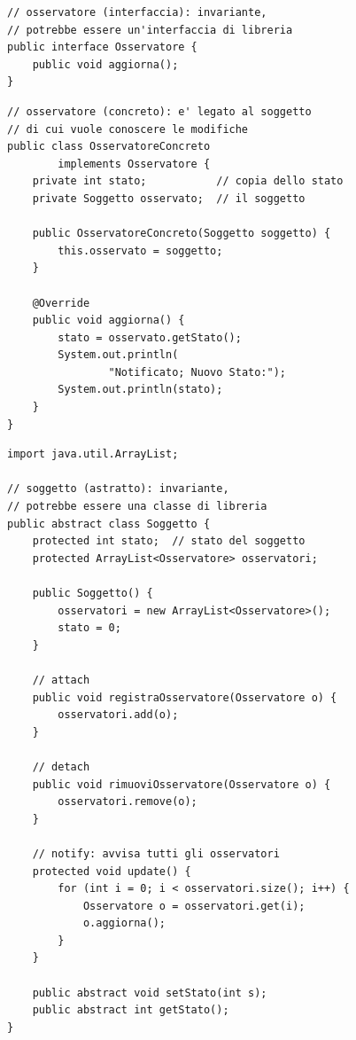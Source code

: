\noindent\begin{minipage}[t]{0.49\textwidth}
\begin{lstlisting}[style=java, name=Osservatore.java]
// osservatore (interfaccia): invariante,
// potrebbe essere un'interfaccia di libreria
public interface Osservatore {
    public void aggiorna();
}
\end{lstlisting}
\begin{lstlisting}[style=java, name=OsservatoreConcreto.java]
// osservatore (concreto): e' legato al soggetto
// di cui vuole conoscere le modifiche
public class OsservatoreConcreto
        implements Osservatore {
    private int stato;           // copia dello stato
    private Soggetto osservato;  // il soggetto

    public OsservatoreConcreto(Soggetto soggetto) {
        this.osservato = soggetto;
    }

    @Override
    public void aggiorna() {
        stato = osservato.getStato();
        System.out.println(
                "Notificato; Nuovo Stato:");
        System.out.println(stato);
    }
}
\end{lstlisting}
\end{minipage}\hfill
\begin{minipage}[t]{0.49\textwidth}
\begin{lstlisting}[style=java, name=Soggetto.java]
import java.util.ArrayList;

// soggetto (astratto): invariante,
// potrebbe essere una classe di libreria
public abstract class Soggetto {
    protected int stato;  // stato del soggetto
    protected ArrayList<Osservatore> osservatori;

    public Soggetto() {
        osservatori = new ArrayList<Osservatore>();
        stato = 0;
    }

    // attach
    public void registraOsservatore(Osservatore o) {
        osservatori.add(o);
    }

    // detach
    public void rimuoviOsservatore(Osservatore o) {
        osservatori.remove(o);
    }

    // notify: avvisa tutti gli osservatori
    protected void update() {
        for (int i = 0; i < osservatori.size(); i++) {
            Osservatore o = osservatori.get(i);
            o.aggiorna();
        }
    }

    public abstract void setStato(int s);
    public abstract int getStato();
}
\end{lstlisting}
\end{minipage}

